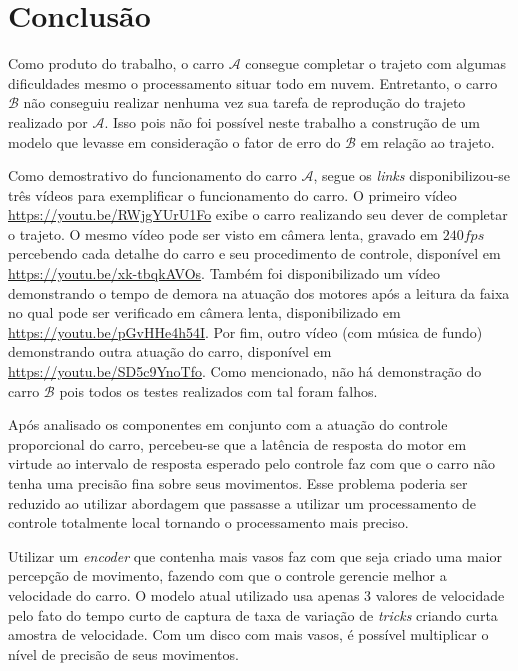 \section{Conclusão} \label{sec:conclusao}

	Como produto do trabalho, o carro $ \mathcal{A} $ consegue completar o trajeto com algumas dificuldades mesmo o processamento situar todo em nuvem. Entretanto, o carro $ \mathcal{B} $ não conseguiu realizar nenhuma vez sua tarefa de reprodução do trajeto realizado por $ \mathcal{A} $. Isso pois não foi possível neste trabalho a construção de um modelo que levasse em consideração o fator de erro do $ \mathcal{B} $ em relação ao trajeto.

	Como demostrativo do funcionamento do carro $ \mathcal{A} $, segue os \textit{links} disponibilizou-se três vídeos para exemplificar o funcionamento do carro. O primeiro vídeo \url{https://youtu.be/RWjgYUrU1Fo} exibe o carro realizando seu dever de completar o trajeto. O mesmo vídeo pode ser visto em câmera lenta, gravado em $240fps$ percebendo cada detalhe do carro e seu procedimento de controle, disponível em \url{https://youtu.be/xk-tbqkAVOs}. Também foi disponibilizado um vídeo demonstrando o tempo de demora na atuação dos motores após a leitura da faixa no qual pode ser verificado em câmera lenta, disponibilizado em \url{https://youtu.be/pGvHHe4h54I}. Por fim, outro vídeo (com música de fundo) demonstrando outra atuação do carro, disponível em \url{https://youtu.be/SD5c9YnoTfo}. Como mencionado, não há demonstração do carro $ \mathcal{B} $ pois todos os testes realizados com tal foram falhos.

    Após analisado os componentes em conjunto com a atuação do controle proporcional do carro, percebeu-se que a latência de resposta do motor em virtude ao intervalo de resposta esperado pelo controle faz com que o carro não tenha uma precisão fina sobre seus movimentos. Esse problema poderia ser reduzido ao utilizar abordagem que passasse a utilizar um processamento de controle totalmente local tornando o processamento mais preciso.
    
	Utilizar um \textit{encoder} que contenha mais vasos faz com que seja criado uma maior percepção de movimento, fazendo com que o controle gerencie melhor a velocidade do carro. 
    O modelo atual utilizado usa apenas 3 valores de velocidade pelo fato do tempo curto de captura de taxa de variação de \textit{tricks} criando curta amostra de velocidade. Com um disco com mais vasos, é possível multiplicar o nível de precisão de seus movimentos.

